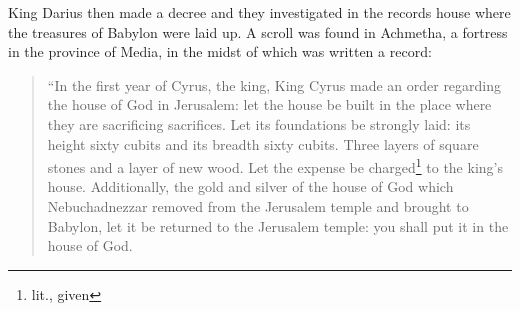 
\begin{inparaenum}
     King Darius then made a decree and they investigated in the records house where the treasures of Babylon were laid up.%
     A scroll was found in Achmetha, a fortress in the province of Media, in the midst of which was written a record:%
\end{inparaenum}

\begin{quotation}
    \begin{inparaenum}\setcounter{enumi}{2}
         ``In the first year of Cyrus, the king, King Cyrus made an order regarding the house of God in Jerusalem: let the house be built in the place where they are sacrificing sacrifices. Let its foundations be strongly laid: its height sixty cubits and its breadth sixty cubits.%
         Three layers of square stones and a layer of new wood. Let the expense be charged\footnote{lit., given} to the king's house.%
         Additionally, the gold and silver of the house of God which Nebuchadnezzar removed from the Jerusalem temple and brought to Babylon, let it be returned to the Jerusalem temple: you shall put it in the house of God.%
        

\end{inparaenum}
\end{quotation}
